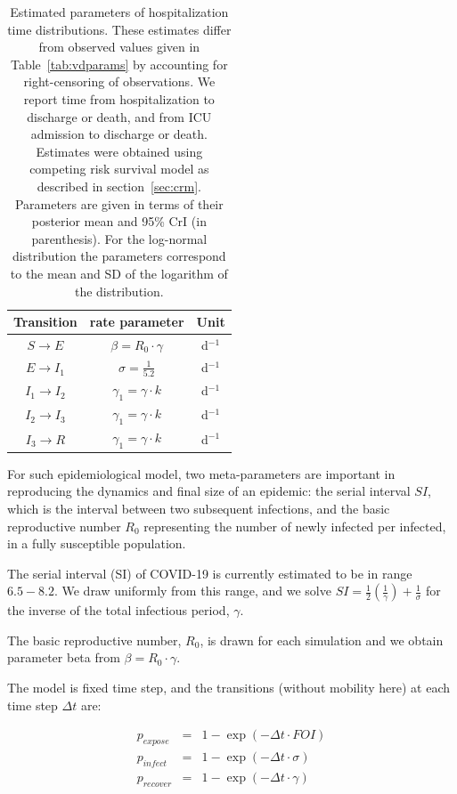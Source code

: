 \begin{table}
    \centering
    \begin{tabular}{ccc}
\toprule
Transition & rate parameter &Unit \\
 \midrule
$S\longrightarrow E$  &   $\beta = R_0 \cdot \gamma$  & d$^{-1}$\\
$E\longrightarrow I_1$ & $\sigma = \frac{1}{5.2}$         & d$^{-1}$\\
$I_1\longrightarrow I_2$ & $\gamma_1 = \gamma \cdot k$ & d$^{-1}$\\
$I_2\longrightarrow I_3$ & $\gamma_1 = \gamma \cdot k$ & d$^{-1}$\\
$I_3\longrightarrow R$&$\gamma_1 = \gamma \cdot k$&d$^{-1}$\\
\bottomrule
\end{tabular}
\caption{Estimated parameters of hospitalization time distributions. These estimates differ from observed values given in Table~\ref{tab:vdparams} by accounting for right-censoring of observations. We report time from hospitalization to discharge or death, and from ICU admission to discharge or death. Estimates were obtained using competing risk survival model as described in section~\ref{sec:crm}. Parameters are given in terms of their posterior mean and 95\% CrI (in parenthesis). For the log-normal distribution the parameters correspond to the mean and SD of the logarithm of the distribution.}
     \label{tab:survpars}
\end{table}

For such epidemiological model, two meta-parameters are important in reproducing 
the dynamics and final size of an epidemic: the serial interval $SI$, which is 
the interval between two subsequent infections, and the basic reproductive number 
$R_0$ representing the number of newly infected per infected, in a fully susceptible population.


The serial interval (SI) of COVID-19 is currently estimated to be in range $6.5-8.2$. We draw uniformly from this range, and we solve
$SI = \frac{1}{2}(\frac{1}{\gamma})+\frac{1}{\sigma}$ for the inverse of the total infectious period,
$\gamma$.

The basic reproductive number, $R_0$, is drawn for each simulation and we obtain parameter beta from
$\beta= R_0 \cdot \gamma$.

The model is fixed time step, and the transitions (without mobility here) at each time step
$\Delta t$ are: 

\begin{eqnarray}
p_{expose} &=&  1 - \exp(-\Delta t \cdot FOI) \\
p_{infect} &=& 1 - \exp(-\Delta t \cdot \sigma)\\
p_{recover} &=& 1 - \exp(-\Delta t \cdot \gamma)
\end{eqnarray}


